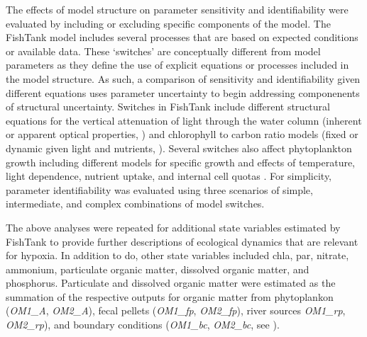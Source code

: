 \documentclass[letterpaper,12pt,oneside]{article}\usepackage[]{graphicx}\usepackage[]{color}
\begin{document}
The effects of model structure on parameter sensitivity and identifiability were evaluated by including or excluding specific components of the model.  The FishTank model includes several processes that are based on expected conditions or available data.  These `switches' are conceptually different from model parameters as they define the use of explicit equations or processes included in the model structure.  As such, a comparison of sensitivity and identifiability given different equations uses parameter uncertainty to begin addressing componenents of structural uncertainty.  Switches in FishTank include different structural equations for the vertical attenuation of light through the water column (inherent or apparent optical properties, \citealt{Penta09,Eldridge10}) and chlorophyll to carbon ratio models (fixed or dynamic given light and nutrients, \citealt{Cloern95}).  Several switches also affect phytoplankton growth including different models for specific growth and effects of temperature, light dependence, nutrient uptake, and internal cell quotas .  For simplicity, parameter identifiability was evaluated using three scenarios of simple, intermediate, and complex combinations of model switches.  

The above analyses were repeated for additional state variables estimated by FishTank to provide further descriptions of ecological dynamics that are relevant for hypoxia.  In addition to \ac{do}, other state variables included \ac{chla}, \ac{par}, nitrate, ammonium, particulate organic matter, dissolved organic matter, and phosphorus.  Particulate and dissolved organic matter were estimated as the summation of the respective outputs for organic matter from phytoplankon (\textit{OM1\_A}, \textit{OM2\_A}), fecal pellets (\textit{OM1\_fp}, \textit{OM2\_fp}), river sources \textit{OM1\_rp}, \textit{OM2\_rp}), and boundary conditions (\textit{OM1\_bc}, \textit{OM2\_bc}, see ). 
\end{document}
